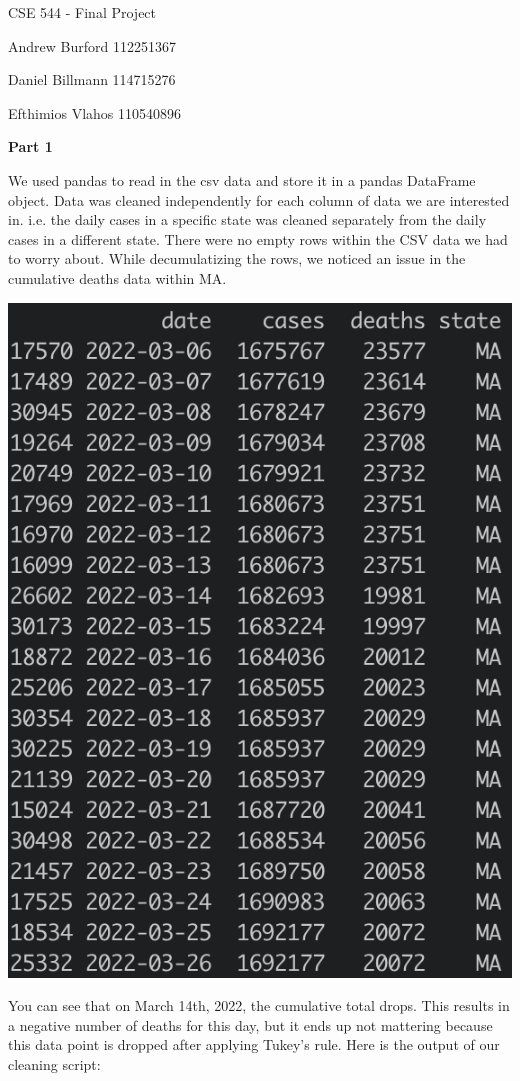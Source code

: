 \documentclass[12pt]{article}
\def\pp{\par\noindent}
\newcommand{\problem}[1]{\bigskip\pp\textbf{Part #1}\smallskip}
\begin{document}
\lstset{basicstyle=\small,language=Python,tabsize=2}
\centerline{CSE 544 - Final Project}
\centerline{Andrew Burford 112251367}
\centerline{Daniel Billmann 114715276}
\centerline{Efthimios Vlahos 110540896}

\problem{1}
\par We used pandas to read in the csv data and store it in a pandas
DataFrame object. Data was cleaned independently for each column of
data we are interested in. i.e. the daily cases in a specific state
was cleaned separately from the daily cases in a different state.
There were no empty rows within the CSV data we had to worry about.
While decumulatizing the rows, we noticed an issue in the cumulative
deaths data within MA.
\pp\includegraphics[scale=0.5]{cumulative_error.png}
\par You can see that on March 14th, 2022, the cumulative total drops.
This results in a negative number of deaths for this day, but it ends
up not mattering because this data point is dropped after applying
Tukey's rule. Here is the output of our cleaning script:

\end{document}

